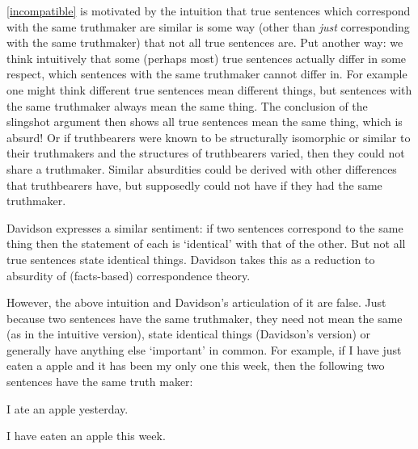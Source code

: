 \ref{incompatible} is motivated by the intuition that true sentences which correspond with the same truthmaker are similar is some way (other than \emph{just} corresponding with the same truthmaker) that not all true sentences are.
Put another way: we think intuitively that some (perhaps most) true sentences actually differ in some respect, which sentences with the same truthmaker cannot differ in.
For example one might think different true sentences mean different things, but sentences with the same truthmaker always mean the same thing.
The conclusion of the slingshot argument then shows all true sentences mean the same thing, which is absurd!
Or if truthbearers were known to be structurally isomorphic or similar to their truthmakers and the structures of truthbearers varied, then they could not share a truthmaker.
Similar absurdities could be derived with other differences that truthbearers have, but supposedly could not have if they had the same truthmaker.

Davidson expresses a similar sentiment: if two sentences correspond to the same thing then the statement of each is `identical' with that of the other.
But not all true sentences state identical things.
Davidson takes this as a reduction to absurdity of (facts-based) correspondence theory.
\parencite[750]{Davidson_1969}

However, the above intuition and Davidson's articulation of it are false.
Just because two sentences have the same truthmaker, they need not mean the same (as in the intuitive version), state identical things (Davidson's version) or generally have anything else `important' in common.
For example, if I have just eaten a apple and it has been my only one this week, then the following two sentences have the same truth maker:

	\begin{example}\label{yesterday}
	I ate an apple yesterday.
	\end{example}

	\begin{example}\label{week}
	I have eaten an apple this week.
	\end{example}

